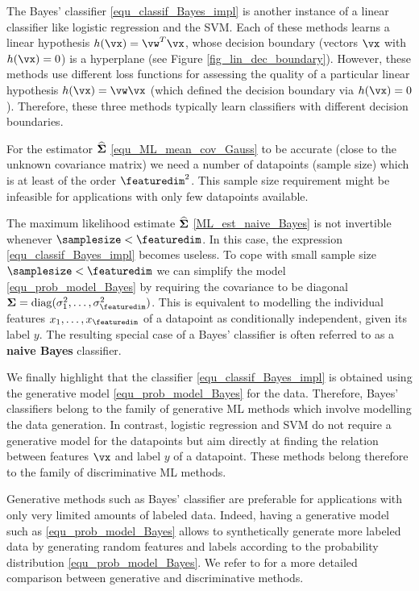 \documentclass[12pt]{report}
\begin{document}
The Bayes' classifier \eqref{equ_classif_Bayes_impl} is another instance of a linear 
classifier like logistic regression and the SVM. Each of these methods learns a 
linear hypothesis $h(\vx)=\vw^{T} \vx$, whose decision boundary (vectors $\vx$ with $h(\vx)=0$) 
is a hyperplane (see Figure \ref{fig_lin_dec_boundary}). However, these methods 
use different loss functions for assessing the quality of a particular linear hypothesis 
$h(\vx)=\vw \vx$ (which defined the decision boundary via $h(\vx)=0$). 
Therefore, these three methods typically learn classifiers with different decision 
boundaries. 

For the estimator $\widehat{\bf \Sigma}$ \eqref{equ_ML_mean_cov_Gauss} 
to be accurate (close to the unknown covariance matrix) we need a number 
of datapoints (sample size) which is at least of the order $\featuredim^{2}$. 
This sample size requirement might be infeasible for applications with only few 
datapoints available. 

The maximum likelihood estimate $\widehat{\bf \Sigma}$ \eqref{ML_est_naive_Bayes} 
is not invertible whenever $\samplesize < \featuredim$. In this case, the expression 
\eqref{equ_classif_Bayes_impl} becomes useless. To cope with small sample size 
$\samplesize < \featuredim$ we can simplify the model \eqref{equ_prob_model_Bayes} 
by requiring the covariance to be diagonal ${\bf \Sigma} = {\rm diag} (\sigma_{1}^{2}, \ldots, \sigma_{\featuredim}^{2})$. 
This is equivalent to modelling the individual features $x_{1},\ldots,x_{\featuredim}$ 
of a datapoint as conditionally independent, given its label $y$. The resulting special case of a Bayes' classifier is often referred to as a 
{\bf naive Bayes} classifier. 

We finally highlight that the classifier \eqref{equ_classif_Bayes_impl} 
is obtained using the generative model \eqref{equ_prob_model_Bayes} 
for the data. Therefore, Bayes' classifiers belong to the family of generative 
ML methods which involve modelling the data generation. In contrast, 
logistic regression and SVM do not require a generative model for the 
datapoints but aim directly at finding the relation between features $\vx$ 
and label $y$ of a datapoint. These methods belong therefore to the 
family of discriminative ML methods. 


Generative methods such as Bayes' classifier are preferable for 
applications with only very limited amounts of labeled data. Indeed, 
having a generative model such as \eqref{equ_prob_model_Bayes} 
allows to synthetically generate more labeled data by generating 
random features and labels according to the probability distribution 
\eqref{equ_prob_model_Bayes}. We refer to \cite{NIPS2001_2020} 
for a more detailed comparison between generative and discriminative 
methods. 
\end{document}
